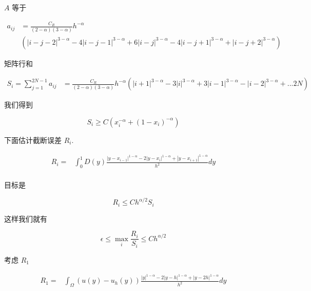 \documentclass{ctexart}
\begin{document}
\(A\) 等于

\begin{equation}
    \begin{aligned}
    a_{ij} &= \frac{C_R}{(2-\alpha)(3-\alpha)} h^{-\alpha} \\
        & \left( |i-j-2|^{3-\alpha} - 4 |i-j-1|^{3-\alpha} + 6 |i-j|^{3-\alpha} - 4 |i-j+1|^{3-\alpha} +  |i-j+2|^{3-\alpha} \right)
    \end{aligned}
\end{equation}

矩阵行和

\begin{equation}
    \begin{aligned}
        S_i = \sum_{j=1}^{2N-1} a_{ij} & = \frac{C_R}{(2-\alpha)(3-\alpha)} h^{-\alpha} 
            ( |i+1|^{3-\alpha} - 3 |i|^{3-\alpha} + 3 |i-1|^{3-\alpha} - |i-2|^{3-\alpha}  + ... 2N )
    \end{aligned}
\end{equation}


我们得到

\begin{equation}
    S_i \ge  C (x_i^{-\alpha} + (1-x_i)^{-\alpha})
\end{equation}


下面估计截断误差 \(R_i\).

\begin{equation}
    \begin{aligned}
        R_i = & \int_0^1 D(y) \frac{ |y-x_{i-1}|^{1-\alpha} - 2|y-x_i |^{1-\alpha} + |y-x_{i+1}|^{1-\alpha} }{h^2} dy    \\
    \end{aligned}
\end{equation}



目标是

\begin{equation}
    R_i \le C h^{\alpha/2} S_i
\end{equation}

这样我们就有

\begin{equation}
    \epsilon \le \max_i \frac{R_i}{S_i} \le Ch^{\alpha/2}
\end{equation}

考虑 \(R_1\)

\begin{equation}
    \begin{aligned}
        R_1 =& \int_\Omega (u(y) - u_h(y)) \frac{ |y|^{1-\alpha} - 2|y-h|^{1-\alpha} + |y-2h|^{1-\alpha} }{h^2} dy      \\
    \end{aligned}
\end{equation}
\end{document}
